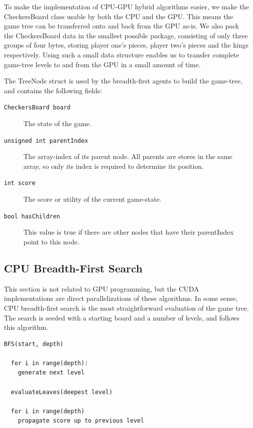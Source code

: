 \documentclass[11pt]{article}
\begin{document}

To make the implementation of CPU-GPU hybrid algorithms easier, we make the
CheckersBoard class usable by both the CPU and the GPU. This means the game tree
can be transferred onto and back from the GPU as-is.
We also pack the CheckersBoard data in the smallest possible package,
consisting of only three groups of four bytes, storing player one's pieces,
player two's pieces and the kings respectively. Using such a small data structure
enables us to transfer complete game-tree levels to and from the GPU in a small
amount of time.

The TreeNode struct is used by the breadth-first agents to build the game-tree, and
contains the following fields:

\begin{description}
    \item[\texttt{CheckersBoard board}] The state of the game.
    \item[\texttt{unsigned int parentIndex}] The array-index of its parent node.
        All
        parents are stores in the same array, so only its index is required to
        determine its position.
    \item[\texttt{int score}] The score or utility of the current game-state.
    \item[\texttt{bool hasChildren}] This value is true if there are other nodes
        that have their parentIndex point to this node.
\end{description}
\newpage
\subsection{CPU Breadth-First Search}
This section is not related to GPU programming, but the CUDA implementations
are direct parallelizations of these algorithms.
In some sense, CPU breadth-first search is the most straightforward evaluation
of the game tree. The search is seeded with a starting board and a number of
levels, and follows this algorithm.

\begin{lstlisting}
BFS(start, depth)
  
  for i in range(depth):
    generate next level

  evaluateLeaves(deepest level)

  for i in range(depth)
    propagate score up to previous level

\end{lstlisting}
\end{document}
